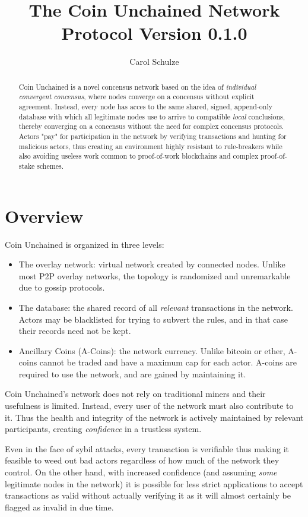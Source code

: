 \documentclass[twocolumn, a4paper]{article}
\title{\textbf{The Coin Unchained Network}\\[14pt]\large Protocol Version 0.1.0}
\author{Carol Schulze}
\begin{document}
\maketitle

\begin{abstract}
    Coin Unchained is a novel concensus network based on the idea of \emph{individual convergent concensus}, where nodes converge on a concensus without explicit agreement. Instead, every node has acces to the same shared, signed, append-only database with which all legitimate nodes use to arrive to compatible \emph{local} conclusions, thereby converging on a concensus without the need for complex concensus protocols. Actors "pay" for participation in the network by verifying transactions and hunting for malicious actors, thus creating an environment highly resistant to rule-breakers while also avoiding useless work common to proof-of-work blockchains and complex proof-of-stake schemes.
\end{abstract}

\section{Overview}

Coin Unchained is organized in three levels:

\begin{itemize}
    \item The overlay network: virtual network created by connected nodes. Unlike most P2P overlay networks, the topology is randomized and unremarkable due to gossip protocols.
    \item The database: the shared record of all \emph{relevant} transactions in the network. Actors may be blacklisted for trying to subvert the rules, and in that case their records need not be kept.
    \item Ancillary Coins (A-Coins): the network currency. Unlike bitcoin or ether, A-coins cannot be traded and have a maximum cap for each actor. A-coins are required to use the network, and are gained by maintaining it.
\end{itemize}

Coin Unchained's network does not rely on traditional miners and their usefulness is limited. Instead, every user of the network must also contribute to it. Thus the health and integrity of the network is actively maintained by relevant participants, creating \emph{confidence} in a trustless system.

Even in the face of sybil attacks, every transaction is verifiable thus making it feasible to weed out bad actors regardless of how much of the network they control. On the other hand, with increased confidence (and assuming \emph{some} legitimate nodes in the network) it is possible for less strict applications to accept transactions as valid without actually verifying it as it will almost certainly be flagged as invalid in due time.
\end{document}
